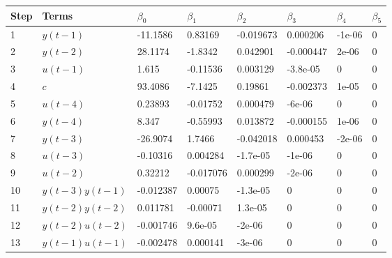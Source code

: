 \begin{tabular}{llllllll}
Step & Terms & $\beta_{0}$ & $\beta_{1}$ & $\beta_{2}$ & $\beta_{3}$ & $\beta_{4}$ & $\beta_{5}$ \\ 
\hline 
1 & $y(t-1)$ & -11.1586 & 0.83169 & -0.019673 & 0.000206 & -1e-06 & 0 \\ 
2 & $y(t-2)$ & 28.1174 & -1.8342 & 0.042901 & -0.000447 & 2e-06 & 0 \\ 
3 & $u(t-1)$ & 1.615 & -0.11536 & 0.003129 & -3.8e-05 & 0 & 0 \\ 
4 & $c$ & 93.4086 & -7.1425 & 0.19861 & -0.002373 & 1e-05 & 0 \\ 
5 & $u(t-4)$ & 0.23893 & -0.01752 & 0.000479 & -6e-06 & 0 & 0 \\ 
6 & $y(t-4)$ & 8.347 & -0.55993 & 0.013872 & -0.000155 & 1e-06 & 0 \\ 
7 & $y(t-3)$ & -26.9074 & 1.7466 & -0.042018 & 0.000453 & -2e-06 & 0 \\ 
8 & $u(t-3)$ & -0.10316 & 0.004284 & -1.7e-05 & -1e-06 & 0 & 0 \\ 
9 & $u(t-2)$ & 0.32212 & -0.017076 & 0.000299 & -2e-06 & 0 & 0 \\ 
10 & $y(t-3)y(t-1)$ & -0.012387 & 0.00075 & -1.3e-05 & 0 & 0 & 0 \\ 
11 & $y(t-2)y(t-2)$ & 0.011781 & -0.00071 & 1.3e-05 & 0 & 0 & 0 \\ 
12 & $y(t-2)u(t-2)$ & -0.001746 & 9.6e-05 & -2e-06 & 0 & 0 & 0 \\ 
13 & $y(t-1)u(t-1)$ & -0.002478 & 0.000141 & -3e-06 & 0 & 0 & 0 \\ 
\hline 
\end{tabular}